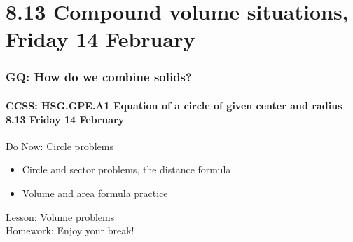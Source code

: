 \documentclass{beamer}
\begin{document}
\section{8.13 Compound volume situations, Friday 14 February}
\frame
{
  \frametitle{GQ: How do we combine solids?}
  \framesubtitle{CCSS: HSG.GPE.A1 Equation of a circle of given center and radius \hfill \alert{8.13 Friday 14 February}}

  \begin{block}{Do Now: Circle problems}
  \begin{itemize}
    \item Circle and sector problems, the distance formula
    \item Volume and area formula practice
  \end{itemize}
  \end{block}
  Lesson: Volume problems\\[5pt]
  Homework: Enjoy your break!
}
\end{document}
